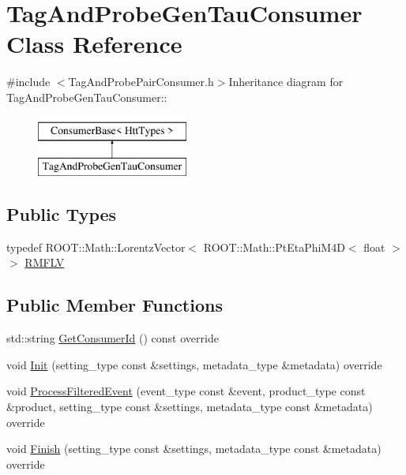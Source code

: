 \hypertarget{classTagAndProbeGenTauConsumer}{
\section{TagAndProbeGenTauConsumer Class Reference}
\label{classTagAndProbeGenTauConsumer}
}


{\ttfamily \#include $<$TagAndProbePairConsumer.h$>$}Inheritance diagram for TagAndProbeGenTauConsumer::\begin{figure}[H]
\begin{center}
\leavevmode
\includegraphics[height=2cm]{classTagAndProbeGenTauConsumer}
\end{center}
\end{figure}
\subsection*{Public Types}
\begin{DoxyCompactItemize}
\item 
typedef ROOT::Math::LorentzVector$<$ ROOT::Math::PtEtaPhiM4D$<$ float $>$ $>$ \hyperlink{classTagAndProbeGenTauConsumer_a636381bac6ddb2ac60260203768d9c42}{RMFLV}
\end{DoxyCompactItemize}
\subsection*{Public Member Functions}
\begin{DoxyCompactItemize}
\item 
std::string \hyperlink{classTagAndProbeGenTauConsumer_ab998d37ebef06d04de51b3983c9fdade}{GetConsumerId} () const override
\item 
void \hyperlink{classTagAndProbeGenTauConsumer_a59e9e2c69ab950447e1341d3ad742625}{Init} (setting\_\-type const \&settings, metadata\_\-type \&metadata) override
\item 
void \hyperlink{classTagAndProbeGenTauConsumer_a9d59f5ddc93e5c198178278460facc7f}{ProcessFilteredEvent} (event\_\-type const \&event, product\_\-type const \&product, setting\_\-type const \&settings, metadata\_\-type const \&metadata) override
\item 
void \hyperlink{classTagAndProbeGenTauConsumer_a5d28789e202ecd55cd3dc6b629df0b56}{Finish} (setting\_\-type const \&settings, metadata\_\-type const \&metadata) override
\end{DoxyCompactItemize}


